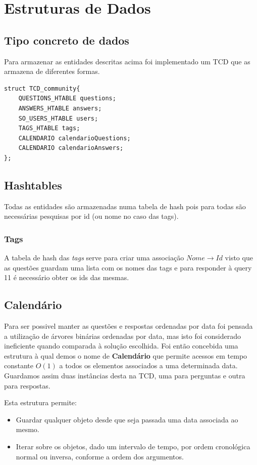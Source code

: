 \documentclass[10pt,a4paper]{article}
\begin{document}
\section{Estruturas de Dados}
    \subsection{Tipo concreto de dados}
    Para armazenar as entidades descritas acima foi implementado um TCD que
    as armazena de diferentes formas.
    \begin{verbatim}
struct TCD_community{
    QUESTIONS_HTABLE questions;
    ANSWERS_HTABLE answers;
    SO_USERS_HTABLE users;
    TAGS_HTABLE tags;
    CALENDARIO calendarioQuestions;
    CALENDARIO calendarioAnswers;
};
    \end{verbatim}
    \subsection{Hashtables}
        Todas as entidades são armazenadas numa tabela de hash pois para todas
        são necessárias pesquisas por id (ou nome no caso das tags).

        \subsubsection{Tags}
        A tabela de hash das \textit{tags} serve para criar uma associação
        $Nome \to Id$ visto que as questões guardam uma lista com os nomes das
        tags e para responder à query 11 é necessário obter os ids das mesmas.

    \subsection{Calendário}
        Para ser possivel manter as questões e respostas ordenadas por data
        foi pensada a utilização de árvores binárias ordenadas por data,
        mas isto foi considerado ineficiente quando comparada à solução
        escolhida. Foi então concebida uma estrutura à qual demos o nome
        de \textbf{Calendário} que permite acessos em tempo constante $O(1)$
        a todos os elementos associados a uma determinada data. Guardamos assim
        duas instâncias desta na TCD, uma para perguntas e outra para respostas.

        Esta estrutura permite:
        \begin{itemize}
                \item Guardar qualquer objeto desde que seja
                      passada uma data associada ao mesmo.
                \item Iterar sobre os objetos, dado um intervalo de tempo,
                      por ordem cronológica normal ou inversa, conforme a
                      ordem dos argumentos.
        \end{itemize}
\end{document}
